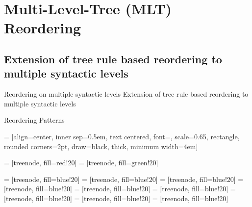 \documentclass[18pt]{beamer}
\begin{document}
\section{Multi-Level-Tree (MLT) Reordering}
\subsection{Extension of tree rule based reordering to multiple syntactic levels}
\begin{frame}{Reordering on multiple syntactic levels}
Extension of tree rule based reordering to multiple syntactic levels 
\begin{figure}
\centering

\end{figure}
\end{frame}

\begin{frame}{Reordering Patterns}

 = [align=center, inner sep=0.5em, text centered, font=\sffamily, scale=0.65, rectangle, rounded corners=2pt, draw=black, thick, minimum width=4em]

 = [treenode, fill=red!20]
 = [treenode, fill=green!20]

 = [treenode, fill=blue!20]
 = [treenode, fill=blue!20]
 = [treenode, fill=blue!20]
 = [treenode, fill=blue!20]
 = [treenode, fill=blue!20]
 = [treenode, fill=blue!20]
 = [treenode, fill=blue!20]
 = [treenode, fill=blue!20]
 = [treenode, fill=blue!20]










\end{frame}
\end{document}
